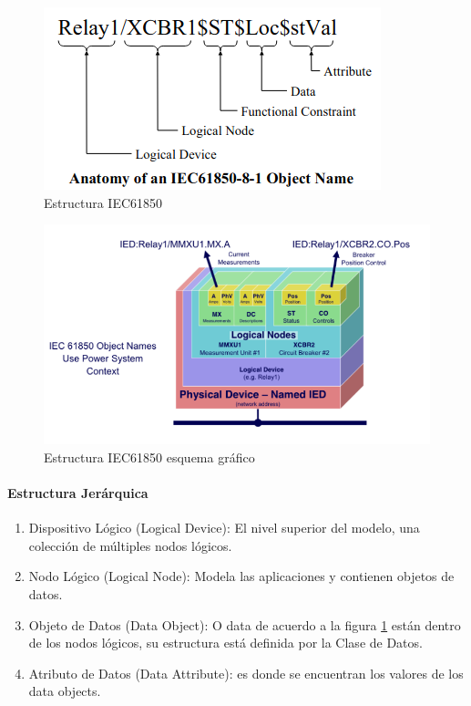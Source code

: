 \documentclass[a5paper]{book}%
\begin{document}
\begin{figure}[H]
  \centering
  \caption{Estructura IEC61850}
  \label{fig:iec61850}
  \includegraphics[width=0.5\linewidth]{anatomia_iec}
\end{figure}

\begin{figure}[H]
  \centering
  \caption{Estructura IEC61850 esquema gráfico}
  \label{fig:iec61850_ln}
  \includegraphics[width=0.7\linewidth]{LNs}
\end{figure}

\paragraph{Estructura Jerárquica}

\begin{enumerate}
\item     Dispositivo Lógico (Logical Device): El nivel superior del modelo, una colección de múltiples nodos lógicos.
    
\item Nodo Lógico (Logical Node): Modela las  aplicaciones y contienen objetos de datos.
    
\item Objeto de Datos (Data Object): O data de acuerdo a la figura \ref{fig:iec61850} están dentro de los nodos lógicos, su estructura está definida por la Clase de Datos.
    
\item Atributo de Datos (Data Attribute): es donde se encuentran los valores de los data objects.
  \end{enumerate}
\end{document}
